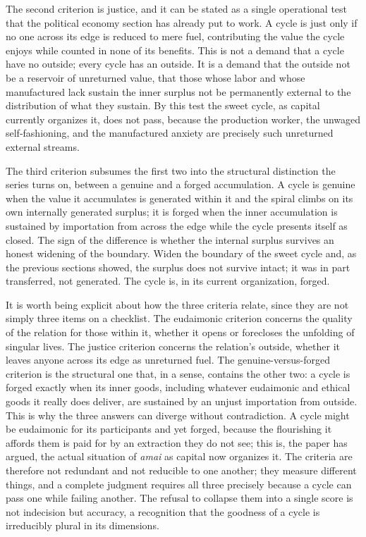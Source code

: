 \documentclass[11pt,a4paper]{article}
\begin{document}
The second criterion is justice, and it can be stated as a single operational test that the political economy section has already put to work. A cycle is just only if no one across its edge is reduced to mere fuel, contributing the value the cycle enjoys while counted in none of its benefits. This is not a demand that a cycle have no outside; every cycle has an outside. It is a demand that the outside not be a reservoir of unreturned value, that those whose labor and whose manufactured lack sustain the inner surplus not be permanently external to the distribution of what they sustain. By this test the sweet cycle, as capital currently organizes it, does not pass, because the production worker, the unwaged self-fashioning, and the manufactured anxiety are precisely such unreturned external streams.

The third criterion subsumes the first two into the structural distinction the series turns on, between a genuine and a forged accumulation. A cycle is genuine when the value it accumulates is generated within it and the spiral climbs on its own internally generated surplus; it is forged when the inner accumulation is sustained by importation from across the edge while the cycle presents itself as closed. The sign of the difference is whether the internal surplus survives an honest widening of the boundary. Widen the boundary of the sweet cycle and, as the previous sections showed, the surplus does not survive intact; it was in part transferred, not generated. The cycle is, in its current organization, forged.

It is worth being explicit about how the three criteria relate, since they are not simply three items on a checklist. The eudaimonic criterion concerns the quality of the relation for those within it, whether it opens or forecloses the unfolding of singular lives. The justice criterion concerns the relation's outside, whether it leaves anyone across its edge as unreturned fuel. The genuine-versus-forged criterion is the structural one that, in a sense, contains the other two: a cycle is forged exactly when its inner goods, including whatever eudaimonic and ethical goods it really does deliver, are sustained by an unjust importation from outside. This is why the three answers can diverge without contradiction. A cycle might be eudaimonic for its participants and yet forged, because the flourishing it affords them is paid for by an extraction they do not see; this is, the paper has argued, the actual situation of \textit{amai} as capital now organizes it. The criteria are therefore not redundant and not reducible to one another; they measure different things, and a complete judgment requires all three precisely because a cycle can pass one while failing another. The refusal to collapse them into a single score is not indecision but accuracy, a recognition that the goodness of a cycle is irreducibly plural in its dimensions.
\end{document}
